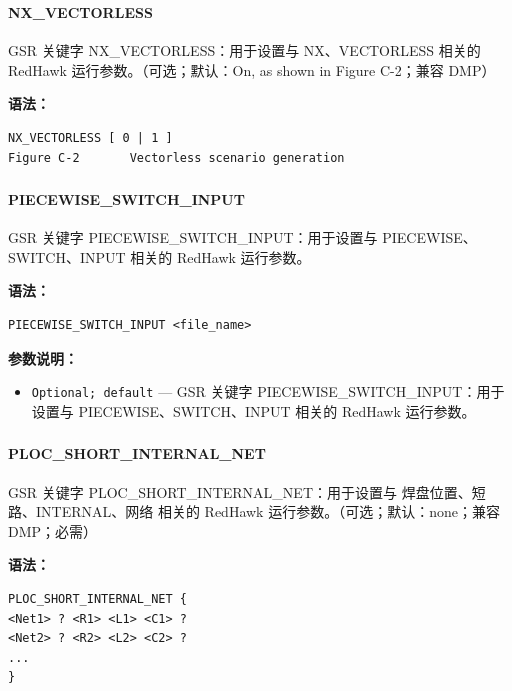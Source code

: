 \subsubsection{}
\paragraph*{NX_VECTORLESS}

GSR 关键字 NX_VECTORLESS：用于设置与 NX、VECTORLESS 相关的 RedHawk 运行参数。（可选；默认：On, as shown in Figure C-2；兼容 DMP）

\textbf{语法：}
\begin{lstlisting}
NX_VECTORLESS [ 0 | 1 ]
Figure C-2       Vectorless scenario generation
\end{lstlisting}

\subsubsection{}
\paragraph*{PIECEWISE_SWITCH_INPUT}

GSR 关键字 PIECEWISE_SWITCH_INPUT：用于设置与 PIECEWISE、SWITCH、INPUT 相关的 RedHawk 运行参数。

\textbf{语法：}
\begin{lstlisting}
PIECEWISE_SWITCH_INPUT <file_name>
\end{lstlisting}

\textbf{参数说明：}
\begin{itemize}
\item \texttt{Optional; default} — GSR 关键字 PIECEWISE\_SWITCH\_INPUT：用于设置与 PIECEWISE、SWITCH、INPUT 相关的 RedHawk 运行参数。
\end{itemize}

\subsubsection{}
\paragraph*{PLOC_SHORT_INTERNAL_NET}

GSR 关键字 PLOC_SHORT_INTERNAL_NET：用于设置与 焊盘位置、短路、INTERNAL、网络 相关的 RedHawk 运行参数。（可选；默认：none；兼容 DMP；必需）

\textbf{语法：}
\begin{lstlisting}
PLOC_SHORT_INTERNAL_NET {
<Net1> ? <R1> <L1> <C1> ?
<Net2> ? <R2> <L2> <C2> ?
...
}
\end{lstlisting}

